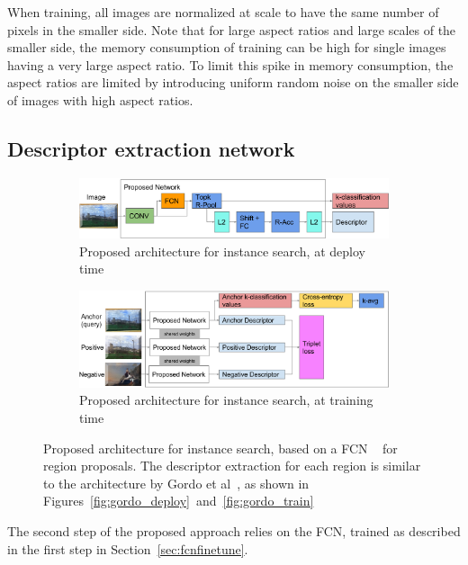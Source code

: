 When training, all images are normalized at scale to have the same
number of pixels in the smaller side. Note that for large aspect
ratios and large scales of the smaller side,
the memory consumption of training can be high for single images
having a very large aspect ratio. To limit this spike in memory
consumption, the aspect ratios are limited by introducing uniform
random noise on the smaller side of images with high aspect ratios.

\subsection{Descriptor extraction network}
\begin{figure}
\begin{subfigure}{\textwidth}
\includegraphics[width=\textwidth]{img/contrib_deploy.png}
\caption{Proposed architecture for instance search, at deploy time
\label{fig:contribdeploy}}
\end{subfigure}

\begin{subfigure}{\textwidth}
\includegraphics[width=\textwidth]{img/contrib_train.png}
\caption{Proposed architecture for instance search, at training time
\label{fig:contribtrain}}
\end{subfigure}
\caption{Proposed architecture for instance search, based on a FCN
~\cite{long_fully_2015} for region proposals. The descriptor extraction
for each region is similar to the architecture by
Gordo et al~\cite{gordo_deep_2016}, as shown in
Figures~\ref{fig:gordo_deploy}~and~\ref{fig:gordo_train}
\label{fig:contrib}}
\end{figure}

The second step of the proposed approach relies on the FCN, trained
as described in the first step in Section~\ref{sec:fcnfinetune}.

